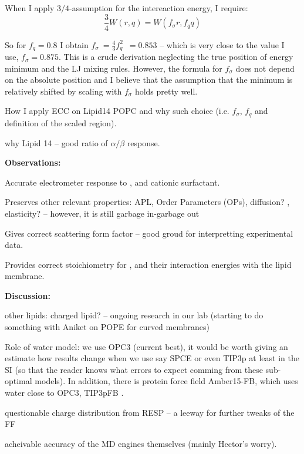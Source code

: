 \documentclass[aip,jcp]{revtex4}
\begin{document}
When I apply $3/4$-assumption for the intereaction energy, I require: 
\begin{equation}
\frac{3}{4} W(r,q) = W(f_\sigma r, f_q q)
\end{equation}

So for $f_q=0.8$ I obtain $f_\sigma ~= \frac{4}{3} f_q^2 \,\,\, = 0.853$ -- which is very close to the value I use, $f_\sigma=0.875$. This is a crude derivation neglecting the true position of energy minimum and the LJ mixing rules. However, the formula for $f_\sigma$ does not depend on the absolute position and I believe that the assumption that the minimum is relatively shifted by scaling with $f_\sigma$ holds pretty well. 


How I apply ECC on Lipid14 POPC and why such choice (i.e. $f_\sigma$, $f_q$ and definition of the scaled region).

why Lipid 14 -- good ratio of $\alpha / \beta$ response.

\textbf{Observations:}

Accurate electrometer response to ,  and  cationic surfactant. 

Preserves other relevant properties: APL, Order Parameters (OPs), diffusion? , elasticity?  -- however, it is still garbage in-garbage out

Gives correct scattering form factor -- good groud for interpretting experimental data.

Provides correct stoichiometry for ,  and their interaction energies with the lipid membrane.

\textbf{Discussion:}

other lipids: charged lipid? -- ongoing research in our lab (starting to do something with Aniket on POPE for curved membranes)

Role of water model: we use OPC3 (current best), it would be worth giving an estimate how results change when we use say SPCE or even TIP3p at least in the SI (so that the reader knows what errors to expect comming from these sub-optimal models). In addition, there is protein force field Amber15-FB, which uses water close to OPC3, TIP3pFB .

questionable charge distribution from RESP -- a leeway for further tweaks of the FF

acheivable accuracy of the MD engines themselves (mainly Hector's worry).
\end{document}
